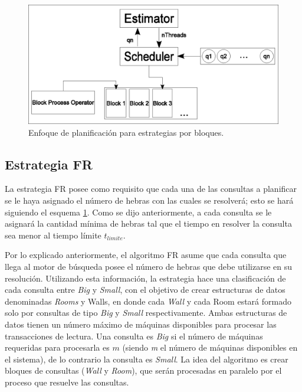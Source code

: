 \begin{figure}[!th]
\centering
\includegraphics[scale=.75]{images/scheduler_bloques.eps}
\caption{Enfoque de planificación para estrategias por bloques.}
\label{fig:schedulerbloques}
\end{figure}  


\subsection{Estrategia FR}
\label{scheduling:fr}
La estrategia FR posee como requisito que cada una de las consultas a planificar se le haya asignado el número de hebras con las cuales se resolverá; esto se hará siguiendo el esquema \ref{fig:schedulerbloques}. Como se dijo anteriormente, a cada consulta se le asignará la cantidad mínima de hebras tal que el tiempo en resolver la consulta sea menor al tiempo límite $t_{limite}$.

Por lo explicado anteriormente, el algoritmo FR asume que cada consulta que llega al motor de búsqueda posee el número de hebras que debe utilizarse en su resolución. Utilizando esta información, la estrategia hace una clasificación de cada consulta entre \textit{Big} y \textit{Small}, con el objetivo de crear estructuras de datos denominadas \textit{Rooms} y {Walls}, en donde cada \textit{Wall} y cada {Room} estará formado solo por consultas de tipo \textit{Big} y \textit{Small} respectivamente. Ambas estructuras de datos tienen un número máximo de máquinas disponibles para procesar las transacciones de lectura. Una consulta es \textit{Big} si el número de máquinas requeridas para procesarla es $m$ (siendo \textit{m} el número de máquinas disponibles en el sistema), de lo contrario la consulta es \textit{Small}. La idea del algoritmo es crear bloques de consultas (\textit{Wall} y \textit{Room}), que serán procesadas en paralelo por el proceso que resuelve las consultas. 


